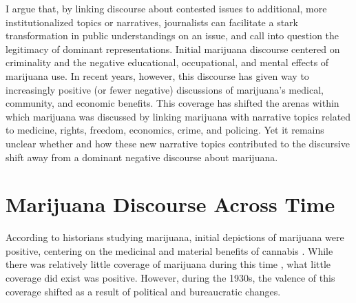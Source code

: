 I argue that, by linking discourse about contested issues to additional, more institutionalized topics or narratives, journalists can facilitate a stark transformation in public understandings on an issue, and call into question the legitimacy of dominant representations. Initial marijuana discourse centered on criminality and the negative educational, occupational, and mental effects of marijuana use. In recent years, however, this discourse has given way to increasingly positive (or fewer negative) discussions of marijuana's medical, community, and economic benefits. This coverage has shifted the arenas within which marijuana was discussed by linking marijuana with narrative topics related to medicine, rights, freedom, economics, crime, and policing. Yet it remains unclear whether and how these new narrative topics contributed to the discursive shift away from a dominant negative discourse about marijuana. 



\section{Marijuana Discourse Across Time}


According to historians studying marijuana, initial depictions of marijuana were positive, centering on the medicinal and material benefits of cannabis \citep{bonnie_and_whitebread_1970,rosenthal_and_kubby_1996}. While there was relatively little coverage of marijuana during this time \citep{bonnie_and_whitebread_1970,mosher_and_akins_2019}, what little coverage did exist was positive. However, during the 1930s, the valence of this coverage shifted as a result of political and bureaucratic changes. 

